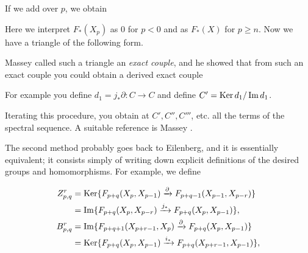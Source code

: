 \documentclass[../main]{subfiles}
\begin{document}
If we add over $p$, we obtain

\begin{center}
\end{center}

Here we interpret $F_{\ast}(X_p)$ as $0$ for $p<0$ and as $F_{\ast}(X)$ for $p\geq n$. Now we have a triangle of the following form.

\begin{center}
\end{center}

Massey called such a triangle an \emph{exact couple}, and he showed that from such an exact couple you could obtain a derived exact couple

\begin{center}
\end{center}

For example you define $d_1=j_{\ast}\partial\colon C\longrightarrow C$ and define $C'=\mathop{\mathrm{Ker}} d_1/\mathop{\mathrm{Im}} d_1$.

Iterating this procedure, you obtain at $C',C'',C'''$, etc. all the terms of the spectral sequence. A suitable reference is Massey \plscite{[9]}.

The second method probably goes back to Eilenberg, and it is essentially equivalent; it consists simply of writing down explicit definitions of the desired groups and homomorphisms. For example, we define


\begin{align*}
    Z_{p,q}^r&=\mathop{\mathrm{Ker}}\{F_{p+q}(X_p,X_{p-1})\xrightarrow{\partial}F_{p+q-1}(X_{p-1},X_{p-r})\}\\
    &=\mathop{\mathrm{Im}}\{F_{p+q}(X_p,X_{p-r})\xrightarrow{j_{\ast}}F_{p+q}(X_p,X_{p-1})\},\\
    B_{p,q}^r&=\mathop{\mathrm{Im}}\{F_{p+q+1}(X_{p+r-1},X_p)\xrightarrow{\partial}F_{p+q}(X_p,X_{p-1})\}\\
    &=\mathop{\mathrm{Ker}}\{F_{p+q}(X_p,X_{p-1})\xrightarrow{i_{\ast}}F_{p+q}(X_{p+r-1},X_{p-1})\},
\end{align*}
\end{document}
